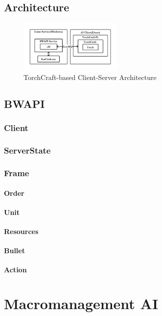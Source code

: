 \documentclass[sigconf]{acmart}
\begin{document}
\subsection{Architecture}
\begin{figure}[htb]
\caption{TorchCraft-based Client-Server Architecture}
\centering
\includegraphics[width=0.45\textwidth]{./img/Client_Server_Architecture.pdf}
\end{figure}

\subsection{BWAPI}
\subsubsection{Client}
\subsubsection{ServerState}
\subsubsection{Frame}
\paragraph{Order}
\paragraph{Unit}
\paragraph{Resources}
\paragraph{Bullet}
\paragraph{Action}

\section{Macromanagement AI}
\end{document}

